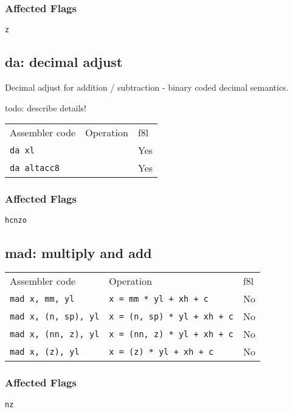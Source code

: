 \documentclass{book}
\begin{document}
\subsubsection*{Affected Flags}

\texttt{z}


\subsection{da: decimal adjust}

Decimal adjust for addition / subtraction - binary coded decimal semantics.

todo: describe details!

\begin{tabular}{l l l}
Assembler code       & Operation & f8l \\
\texttt{da xl}      &           & Yes \\
\texttt{da altacc8} &           & Yes \\
\end{tabular}

\subsubsection*{Affected Flags}

\texttt{hcnzo}


\subsection{mad: multiply and add}

\begin{tabular}{l l l}
Assembler code              & Operation                          & f8l \\
\texttt{mad x, mm, yl}      & \texttt{x = mm * yl + xh + c}      & No \\
\texttt{mad x, (n, sp), yl} & \texttt{x = (n, sp) * yl + xh + c} & No \\
\texttt{mad x, (nn, z), yl} & \texttt{x = (nn, z) * yl + xh + c} & No \\
\texttt{mad x, (z), yl}     & \texttt{x = (z) * yl + xh + c}     & No \\
\end{tabular}

\subsubsection*{Affected Flags}

\texttt{nz}
\end{document}
